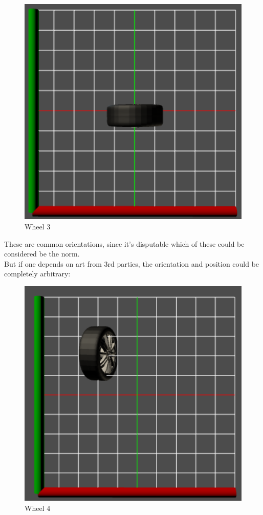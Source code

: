 \begin{figure}[htbp]
	\includegraphics[width=12cm]{../assets/wheel3.png}
	\caption{Wheel 3}
	\label{fig:wheel3}
\end{figure}


These are common orientations, since it's disputable which of these
could be considered be the norm.\\
But if one depends on art from 3rd parties, the orientation and position
could be completely arbitrary:\\
\begin{figure}[htbp]
	\includegraphics[width=12cm]{../assets/wheel4.png}
	\caption{Wheel 4}
	\label{fig:wheel4}
\end{figure}

